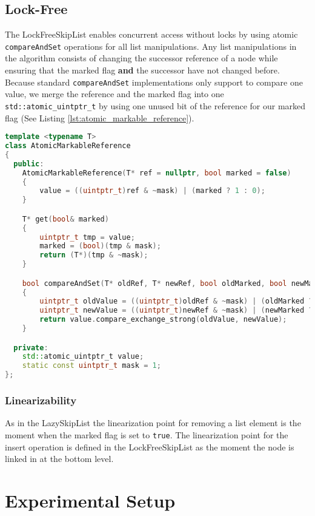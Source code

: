\subsection{Lock-Free}
The LockFreeSkipList enables concurrent access without locks by using atomic \texttt{compareAndSet} operations for all list manipulations. Any list manipulations in the algorithm consists of changing the successor reference of a node while ensuring that the marked flag \textbf{and} the successor have not changed before. Because standard \texttt{compareAndSet} implementations only support to compare one value, we merge the reference and the marked flag into one \texttt{std::atomic\_uintptr\_t} by using one unused bit of the reference for our marked flag (See Listing \ref{lst:atomic_markable_reference}).

\begin{lstlisting}[language=C++, caption={AtomicMarkableReference}, label=lst:atomic_markable_reference]
template <typename T>
class AtomicMarkableReference
{
  public:
    AtomicMarkableReference(T* ref = nullptr, bool marked = false)
    {
        value = ((uintptr_t)ref & ~mask) | (marked ? 1 : 0);
    }

    T* get(bool& marked)
    {
        uintptr_t tmp = value;
        marked = (bool)(tmp & mask);
        return (T*)(tmp & ~mask);
    }

    bool compareAndSet(T* oldRef, T* newRef, bool oldMarked, bool newMarked)
    {
        uintptr_t oldValue = ((uintptr_t)oldRef & ~mask) | (oldMarked ? 1 : 0);
        uintptr_t newValue = ((uintptr_t)newRef & ~mask) | (newMarked ? 1 : 0);
        return value.compare_exchange_strong(oldValue, newValue);
    }

  private:
    std::atomic_uintptr_t value;
    static const uintptr_t mask = 1;
};
\end{lstlisting}

\subsubsection*{Linearizability}
\noindent As in the LazySkipList the linearization point for removing a list element is the moment when the marked flag is set to \texttt{true}. The linearization point for the insert operation is defined in the LockFreeSkipList as the moment the node is linked in at the bottom level.

\section{Experimental Setup}

